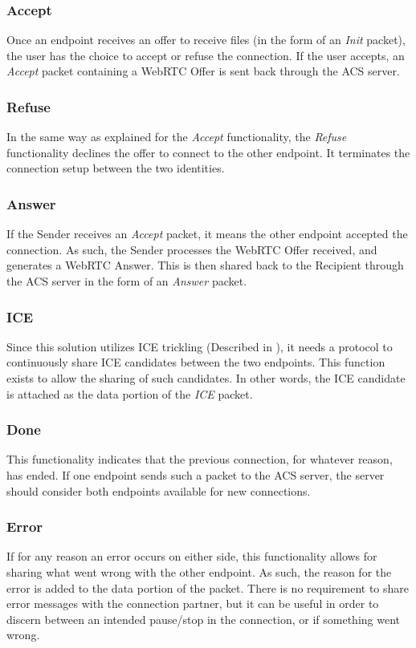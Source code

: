 	\subsubsection*{Accept}
	Once an endpoint receives an offer to receive files (in the form of an \emph{Init} packet), the user has the choice to accept or refuse the connection. If the user accepts, an \emph{Accept} packet containing a WebRTC Offer is sent back through the ACS server.

	\subsubsection*{Refuse}
	In the same way as explained for the \emph{Accept} functionality, the \emph{Refuse} functionality declines the offer to connect to the other endpoint. It terminates the connection setup between the two identities.

	\subsubsection*{Answer}
	If the Sender receives an \emph{Accept} packet, it means the other endpoint accepted the connection. As such, the Sender processes the WebRTC Offer received, and generates a WebRTC Answer. This is then shared back to the Recipient through the ACS server in the form of an \emph{Answer} packet.

	\subsubsection*{ICE}
	Since this solution utilizes ICE trickling (Described in ), it needs a protocol to continuously share ICE candidates between the two endpoints. This function exists to allow the sharing of such candidates. In other words, the ICE candidate is attached as the data portion of the \emph{ICE} packet.

	\subsubsection*{Done}
	This functionality indicates that the previous connection, for whatever reason, has ended. If one endpoint sends such a packet to the ACS server, the server should consider both endpoints available for new connections.

	\subsubsection*{Error}
	If for any reason an error occurs on either side, this functionality allows for sharing what went wrong with the other endpoint. As such, the reason for the error is added to the data portion of the packet. There is no requirement to share error messages with the connection partner, but it can be useful in order to discern between an intended pause/stop in the connection, or if something went wrong.

